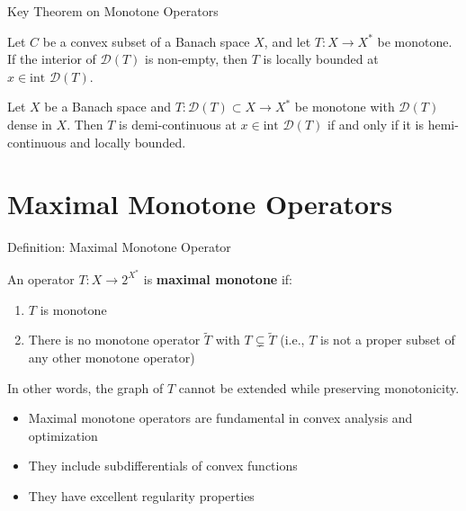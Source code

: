 \documentclass[aspectratio=169,10pt]{beamer}
\begin{document}
\begin{frame}[fragile]{Key Theorem on Monotone Operators}

\begin{theorem}
Let $C$ be a convex subset of a Banach space $X$, and let $T : X \to X^*$ be monotone. If the interior of $\mathcal{D}(T)$ is non-empty, then $T$ is locally bounded at $x \in \text{int } \mathcal{D}(T)$.
\end{theorem}

\begin{theorem}
Let $X$ be a Banach space and $T : \mathcal{D}(T) \subset X \to X^*$ be monotone with $\mathcal{D}(T)$ dense in $X$. Then $T$ is demi-continuous at $x \in \text{int } \mathcal{D}(T)$ if and only if it is hemi-continuous and locally bounded.
\end{theorem}

\end{frame}


\section{Maximal Monotone Operators}

\begin{frame}{Definition: Maximal Monotone Operator}

\begin{definition}
An operator $T : X \to 2^{X^*}$ is \textbf{maximal monotone} if:
\begin{enumerate}
\item $T$ is monotone
\item There is no monotone operator $\tilde{T}$ with $T \subsetneq \tilde{T}$ (i.e., $T$ is not a proper subset of any other monotone operator)
\end{enumerate}
\end{definition}

\vspace{0.3cm}

In other words, the graph of $T$ cannot be extended while preserving monotonicity.

\vspace{0.3cm}

\begin{itemize}
\item Maximal monotone operators are fundamental in convex analysis and optimization
\item They include subdifferentials of convex functions
\item They have excellent regularity properties
\end{itemize}

\end{frame}
\end{document}
